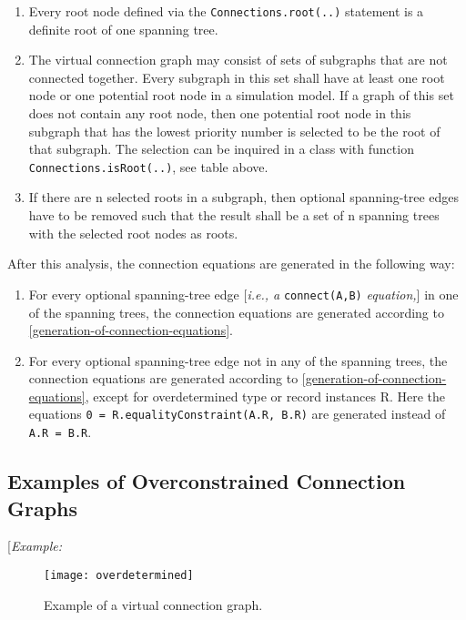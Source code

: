 \begin{enumerate}
\item
  Every root node defined via the \lstinline!Connections.root(..)! statement is
  a definite root of one spanning tree.
\item
  The virtual connection graph may consist of sets of subgraphs that are
  not connected together. Every subgraph in this set shall have at least
  one root node or one potential root node in a simulation model. If a
  graph of this set does not contain any root node, then one potential
  root node in this subgraph that has the lowest priority number is
  selected to be the root of that subgraph. The selection can be
  inquired in a class with function \lstinline!Connections.isRoot(..)!, see table
  above.
\item
  If there are n selected roots in a subgraph, then optional spanning-tree edges
  have to be removed such that the result shall be a set of n spanning
  trees with the selected root nodes as roots.
\end{enumerate}

After this analysis, the connection equations are generated in the
following way:

\begin{enumerate}
\item
  For every optional spanning-tree edge {[}\emph{i.e., a} \lstinline!connect(A,B)!
  \emph{equation,}{]} in one of the spanning trees, the connection
  equations are generated according to \autoref{generation-of-connection-equations}.
\item
  For every optional spanning-tree edge not in any of the spanning trees, the
  connection equations are generated according to \autoref{generation-of-connection-equations}, except
  for overdetermined type or record instances R. Here the equations
  \lstinline!0 = R.equalityConstraint(A.R, B.R)! are generated instead
  of \lstinline!A.R = B.R!.
\end{enumerate}

\subsection{Examples of Overconstrained Connection Graphs}

{[}\emph{Example:}

\begin{figure}[H]
\caption{Example of a virtual connection graph.}
\texttt{[image: overdetermined]}
\end{figure}


